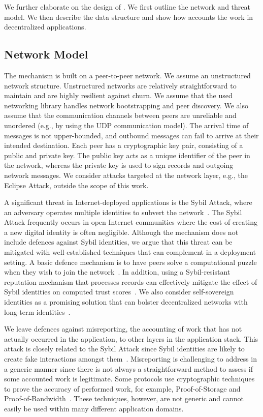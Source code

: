 We further elaborate on the design of \TrustChain{}.
We first outline the network and threat model.
We then describe the \TrustChain{} data structure and show how \TrustChain{} accounts the work in decentralized applications.

\subsection{Network Model}
\label{sec:network_model}
The \TrustChain{} mechanism is built on a peer-to-peer network.
We assume an unstructured network structure.
Unstructured networks are relatively straightforward to maintain and are highly resilient against churn.
We assume that the used networking library handles network bootstrapping and peer discovery.
We also assume that the communication channels between peers are unreliable and unordered (e.g., by using the UDP communication model).
The arrival time of messages is not upper-bounded, and outbound messages can fail to arrive at their intended destination.
Each peer has a cryptographic key pair, consisting of a public and private key.
The public key acts as a unique identifier of the peer in the network, whereas the private key is used to sign records and outgoing network messages.
We consider attacks targeted at the network layer, e.g., the Eclipse Attack, outside the scope of this work.

A significant threat in Internet-deployed applications is the Sybil Attack, where an adversary operates multiple identities to subvert the network~\cite{douceur2002sybil}.
The Sybil Attack frequently occurs in open Internet communities where the cost of creating a new digital identity is often negligible.
Although the \TrustChain{} mechanism does not include defences against Sybil identities, we argue that this threat can be mitigated with well-established techniques that can complement \TrustChain{} in a deployment setting.
A basic defence mechanism is to have peers solve a computational puzzle when they wish to join the network~\cite{li2012sybilcontrol}.
In addition, using a Sybil-resistant reputation mechanism that processes \TrustChain{} records can effectively mitigate the effect of Sybil identities on computed trust scores~\cite{delaviz2012sybilres,yu2008sybillimit}.
We also consider self-sovereign identities as a promising solution that can bolster decentralized networks with long-term identities~\cite{stokkink2018deployment}.

We leave defences against misreporting, the accounting of work that has not actually occurred in the application, to other layers in the application stack.
This attack is closely related to the Sybil Attack since Sybil identities are likely to create fake interactions amongst them~\cite{stannat2021sybil}.
Misreporting is challenging to address in a generic manner since there is not always a straightforward method to assess if some accounted work is legitimate.
Some protocols use cryptographic techniques to prove the accuracy of performed work, for example, Proof-of-Storage and Proof-of-Bandwidth~\cite{benet2018filecoin,ghosh2014torpath}.
These techniques, however, are not generic and cannot easily be used within many different application domains.

